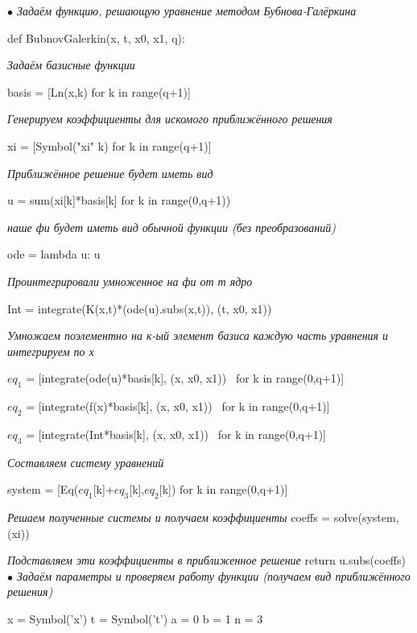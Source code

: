 \documentclass[12pt]{article}
\begin{document}
\textit{$ \bullet $                     Задаём функцию, решающую уравнение методом Бубнова-Галёркина} \vskip 0.3cm

def BubnovGalerkin(x, t, x0, x1, q): \vskip 0.3cm

\textit{Задаём базисные функции} \vskip 0.3cm

basis = [Ln(x,k) for k in range(q+1)] \vskip 0.3cm

\textit{Генерируем коэффициенты для искомого приближённого решения} \vskip 0.3cm

xi = [Symbol("xi"  k) for k in range(q+1)] \vskip 0.3cm

\textit{ Приближённое решение будет иметь вид} \vskip 0.3cm

u = sum(xi[k]*basis[k] for k in range(0,q+1))

\textit{наше фи будет иметь вид обычной функции (без преобразований)   } \vskip 0.3cm

ode = lambda u: u \vskip 0.3cm

\textit{ Проинтегрировали умноженное на фи от т ядро } \vskip 0.3cm

Int = integrate(K(x,t)*(ode(u).subs(x,t)), (t, x0, x1)) \vskip 0.3cm

\textit{Умножаем поэлементно на к-ый элемент базиса каждую часть уравнения и интегрируем по х} \vskip 0.3cm

$ eq_1 $ = [integrate(ode(u)*basis[k], (x, x0, x1)) \
for k in range(0,q+1)] \vskip 0.3cm

$ eq_2 $ = [integrate(f(x)*basis[k], (x, x0, x1)) \
for k in range(0,q+1)] \vskip 0.3cm

$ eq_3 $ = [integrate(Int*basis[k], (x, x0, x1)) \
for k in range(0,q+1)] \vskip 0.3cm


\textit{Составляем систему уравнений } \vskip 0.3cm

system = [Eq($ eq_1 $[k]+$ eq_3 $[k],$ eq_2 $[k]) for k in range(0,q+1)] \vskip 0.3cm

\textit{Решаем полученные системы и получаем коэффициенты} \vskip 0.3cm
coeffs = solve(system, (xi)) \vskip 0.3cm

\textit{Подставляем эти коэффициенты в приближенное решение} \vskip 0.3cm
return u.subs(coeffs)\\

\textit{$ \bullet $                 Задаём параметры и проверяем работу функции (получаем вид приближённого решения)} \vskip 0.3cm

x = Symbol('x') \vskip 0.3cm
t = Symbol('t') \vskip 0.3cm
a = 0 \vskip 0.3cm
b = 1 \vskip 0.3cm
n = 3 \vskip 0.3cm
\end{document}

